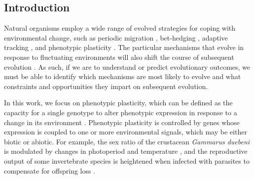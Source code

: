 \documentclass[utf8]{frontiersSCNS} %
\begin{document}
\begin{raggedbottom}


\section{Introduction}

Natural organisms employ a wide range of evolved strategies for coping with environmental change, such as
periodic migration \citep{winger_long_2019},
bet-hedging \citep{beaumont_experimental_2009},
adaptive tracking \citep{barrett_adaptation_2008},
and phenotypic plasticity \citep{ghalambor_adaptive_2007}.
The particular mechanisms that evolve in response to fluctuating environments will also shift the course of subsequent evolution \citep{wennersten_population-level_2012,schaum_plasticity_2014}.
As such, if we are to understand or predict evolutionary outcomes, we must be able to identify which mechanisms are most likely to evolve and what constraints and opportunities they impart on subsequent evolution.

In this work, we focus on phenotypic plasticity, which can be defined as the capacity for a single genotype to alter phenotypic expression in response to a change in its environment \citep{west-eberhard_developmental_2003}.
Phenotypic plasticity is controlled by genes whose expression is coupled to one or more environmental signals, which may be either biotic or abiotic.
For example, the sex ratio of the crustacean \textit{Gammarus duebeni} is modulated by changes in photoperiod and temperature \citep{dunn_two_2005}, and the reproductive output of some invertebrate species is heightened when infected with parasites to compensate for offspring loss \citep{chadwick_parasite-mediated_2005}.



\end{raggedbottom}
\end{document}
